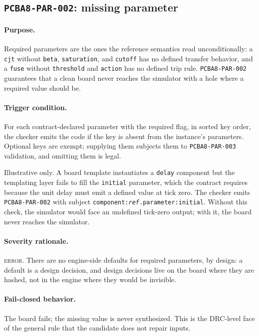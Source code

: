 \subsection{\texttt{PCBA8-PAR-002}: missing parameter}\label{ch07:sub:par002}

\paragraph{Purpose.} Required parameters are the ones the reference semantics read unconditionally: a \texttt{cjt} without \texttt{beta}, \texttt{saturation}, and \texttt{cutoff} has no defined transfer behavior, and a \texttt{fuse} without \texttt{threshold} and \texttt{action} has no defined trip rule. \texttt{PCBA8-PAR-002} guarantees that a clean board never reaches the simulator with a hole where a required value should be.

\paragraph{Trigger condition.} For each contract-declared parameter with the required flag, in sorted key order, the checker emits the code if the key is absent from the instance's parameters. Optional keys are exempt; supplying them subjects them to \texttt{PCBA8-PAR-003} validation, and omitting them is legal.

\begin{example}\label{ch07:ex:par002}
Illustrative only. A board template instantiates a \texttt{delay} component but the templating layer fails to fill the \texttt{initial} parameter, which the contract requires because the unit delay must emit a defined value at tick zero. The checker emits \texttt{PCBA8-PAR-002} with subject \texttt{component:\emph{ref}.parameter:initial}. Without this check, the simulator would face an undefined tick-zero output; with it, the board never reaches the simulator.
\end{example}

\paragraph{Severity rationale.} \textsc{error}. There are no engine-side defaults for required parameters, by design: a default is a design decision, and design decisions live on the board where they are hashed, not in the engine where they would be invisible.

\paragraph{Fail-closed behavior.} The board fails; the missing value is never synthesized. This is the DRC-level face of the general rule that the candidate does not repair inputs.

